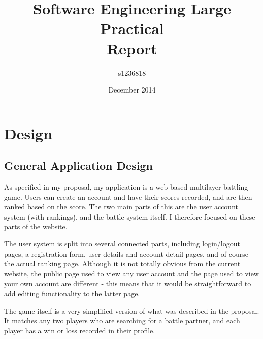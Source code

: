 \documentclass{article}
\begin{document}
\author{s1236818}
\title{Software Engineering Large Practical \\ Report}
\date{December 2014}
\maketitle

\section{Design}
\subsection{General Application Design}

As specified in my proposal, my application is a web-based multilayer battling game. Users can create an account and have their scores recorded, and are then ranked based on the score. The two main parts of this are the user account system (with rankings), and the battle system itself. I therefore focused on these parts of the website. 

The user system is split into several connected parts, including login/logout pages, a registration form, user details and account detail pages, and of course the actual ranking page. Although it is not totally obvious from the current website, the public page used to view any user account and the page used to view your own account are different - this means that it would be straightforward to add editing functionality to the latter page.

The game itself is a very simplified version of what was described in the proposal. It matches any two players who are searching for a battle partner, and each player has a win or loss recorded in their profile.
\end{document}
